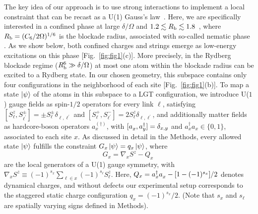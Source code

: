 \documentclass[footinbib,a4paper,aps,superscriptaddress,twocolumn,preprintnumbers,amsmath,amssymb,nobalancelastpage,10pt,prl]{revtex4-2}
\begin{document}
The key idea of our approach is to use 
strong interactions to implement a local constraint that can be recast as a U(1) Gauss's law~\cite{Surace_2020}. Here, we are specifically interested in a confined phase at large $\delta/\Omega$ and $1.2 \lesssim R_{\rm b} \lesssim 1.8$~\cite{Samajdar_2021}, where $R_{\rm b} = (C_6 / 2\Omega)^{1/6}$ is the blockade radius, associated with so-called nematic phase \cite{Samajdar_2021}. As we show below, both confined charges and strings emerge as low-energy excitations on this phase [Fig.~\ref{fig:fig1}(c)].
More precisely, in the Rydberg blockade regime ($R_{\rm b}^6 \gg \delta/\Omega$) at most one atom within the blockade radius can be excited to a Rydberg state.
In our chosen geometry, this subspace contains only four configurations in the neighborhood of each site [Fig.~\ref{fig:fig1}(b)]. To map a state $\ket{\psi}$ of the atoms in this subspace to a LGT configuration, we introduce U($1$) gauge fields as spin-$1/2$ operators for every link $\ell$, satisfying $[S^z_\ell, S^{\pm}_{\ell^\prime}] =\pm S^{\pm}_\ell\delta_{\ell,\ell^\prime}$ and $[S^+_\ell,S^-_{\ell^\prime}] = 2S^z_\ell\delta_{\ell,\ell^\prime}$, and additionally matter fields as hardcore-boson operators $a^{(\dagger)}_x$, with $[a^{\vphantom{\dagger}}_x, a^\dagger_{y}] = \delta_{x,y}$ and $a^\dagger_xa_x \in \{0,1\}$, associated to each site $x$.
 As discussed in detail in the Methods, every allowed state $\ket{\psi}$ fulfills the constraint $G_x\ket{\psi} = q_x\ket{\psi}$, where
\begin{equation}
\label{eq:gauge_generators}
    G_x = \nabla_x S^z - Q_x \;
\end{equation}
are the local generators of a U(1) gauge symmetry, with $\nabla_x S^z \equiv (-1)^{s_x}\sum_{\ell\in x} (-1)^{s_\ell} S^z_\ell$. Here, $Q_x = a^\dagger_x a^{\vphantom{\dagger}}_{x} - [1 - (-1)^{s_x}]/2$ denotes dynamical charges, and without defects our experimental setup corresponds to the staggered static charge configuration $q_x = (-1)^{s_x}/2$. (Note that $s_x$ and $s_\ell$ are spatially varying signs defined in Methods).
\end{document}
